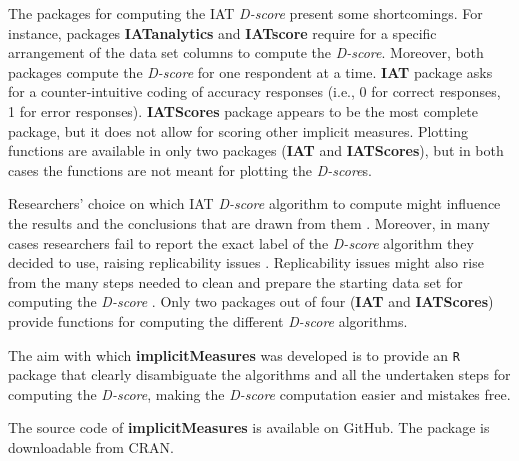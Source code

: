 \documentclass[12pt]{book}
\begin{document}
The packages for computing the IAT \emph{D-score} present some shortcomings. For instance, packages  \textbf{IATanalytics} and \textbf{IATscore} require for a specific arrangement of the data set columns to compute the \emph{D-score}. Moreover, both packages compute the \emph{D-score} for one respondent at a time. \textbf{IAT} package asks for a counter-intuitive coding of accuracy responses (i.e., 0 for correct responses, 1 for error responses). \textbf{IATScores} package appears to be the most complete package, but it does not allow for scoring other implicit measures. Plotting functions are available in only two packages (\textbf{IAT} and \textbf{IATScores}), but in both cases the functions are not meant for plotting the \emph{D-score}s.

Researchers' choice on which IAT \emph{D-score} algorithm to compute might influence the results and the conclusions that are drawn from them \cite{ellithorpe2015}. Moreover, in many cases researchers fail to report the exact label of the \emph{D-score} algorithm they decided to use, raising replicability issues \cite{ellithorpe2015}. Replicability issues might also rise from the many steps needed to clean and prepare the starting data set for computing the \emph{D-score} \cite{ellithorpe2015}. 
Only two packages out of four (\textbf{IAT} and \textbf{IATScores}) provide functions for computing the different \emph{D-score} algorithms. 

The aim with which \textbf{implicitMeasures} was developed is to provide an \texttt{R} package that clearly disambiguate the algorithms and all the undertaken steps for computing the \emph{D-score}, making the \emph{D-score} computation easier and mistakes free.

The source code of \textbf{implicitMeasures} is available on GitHub. The package is downloadable from CRAN.
 
\end{document}
